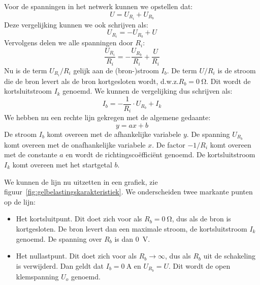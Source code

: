 Voor de spanningen in het netwerk kunnen we opstellen dat:
%
\begin{equation}
U = U_{R_i} + U_{R_b}
\end{equation}
%
Deze vergelijking kunnen we ook schrijven als:
\begin{equation}
U_{R_i} = - U_{R_b} + U
\end{equation}
%
Vervolgens delen we alle spanningen door $R_i$:
%
\begin{equation}
\dfrac{U_{R_i}}{R_i} = - \dfrac{U_{R_b}}{R_i} + \dfrac{U}{R_i}
\end{equation}
%
Nu is de term $U_{R_i}/R_i$ gelijk aan de (bron-)stroom $I_b$. De term $U/R_i$ is de stroom die de bron levert
als de bron kortgesloten wordt, d.w.z.\@ $R_b=\SI{0}{\ohm}$. Dit wordt de kortsluitstroom $I_k$ genoemd. We kunnen de
vergelijking dus schrijven als:
%
\begin{equation}
\label{equ:gelbelastingsfunctie}
I_b = -\dfrac{1}{R_i}\cdot U_{R_b} + I_k
\end{equation}
%
We hebben nu een rechte lijn gekregen met de algemene gedaante:
%
\begin{equation}
y=ax+b
\end{equation}
%
De stroom $I_b$ komt overeen met de afhankelijke variabele $y$. De spanning $U_{R_b}$ komt overeen met de
onafhankelijke variabele $x$. De factor $-1/R_i$ komt overeen met de constante $a$ en wordt de
richtingsco\"effici\"ent genoemd. De kortsluitstroom $I_k$ komt overeen met het startgetal $b$.

We kunnen de lijn nu uitzetten in een grafiek, zie figuur~\ref{fig:gelbelastingskarakteristiek}.
We onderscheiden twee markante punten op de lijn:

\begin{itemize}
\item Het kortsluitpunt. Dit doet zich voor als $R_b=\SI{0}{\ohm}$, dus als de bron is kortgesloten. De bron
      levert dan een maximale stroom, de kortsluitstroom $I_k$ genoemd. De spanning over $R_b$ is
      dan \SI{0}{\volt}.
\item Het nullastpunt. Dit doet zich voor als $R_b \rightarrow \infty$, dus als $R_b$ uit de schakeling
      is verwijderd. Dan geldt dat $I_b=\SI{0}{\ampere}$ en $U_{R_b}=U$. Dit wordt de open klemspanning
      $U_o$ genoemd. 
\end{itemize}

